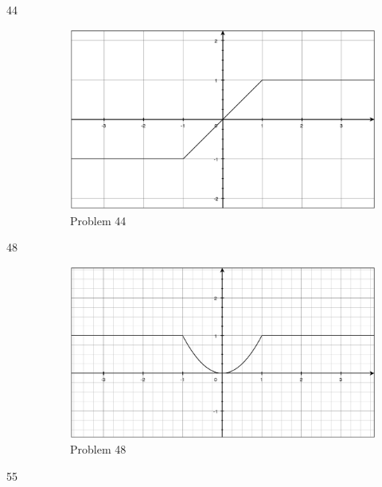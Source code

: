 \documentclass{exam}
\begin{document}
\begin{description}
    \item[44]
      \begin{figure}[H]
        \centering
        \includegraphics[scale=.3]{section_2.2/problem44.eps}
        \caption*{Problem 44}
      \end{figure}

    \item[48]
      \begin{figure}[H]
        \centering
        \includegraphics[scale=.3]{section_2.2/problem48.eps}
        \caption*{Problem 48}
      \end{figure}

    \item[55]
\end{description}
\end{document}
